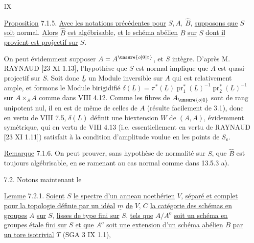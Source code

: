 \hfill IX

\uline{Proposition} 7.1.5. \uline{Avec les notations précédentes pour} $S,A,\ \hat B$, \uline{supposons que} $S$ \uline{soit} normal. \uline{Alors} $\hat B$ \uline{est algébrisable}, \uline{et le schéma abélien} $B$ \uline{sur} $S$ \uline{dont il provient est projectif sur} $S$.

On peut évidemment supposer $A=A^{\unsure{o|0|\circ}}$, et $S$ intègre. D'après M. RAYNAUD [23 XI 1.13], l'hypothèse que $S$ est normal implique que $A$ est quasi-projectif sur $S$. Soit donc $\underline L$ un Module inversible sur $A$ qui est relativement ample, et formons le Module birigidifié $\delta(\underline L)=\pi^*(\underline L)\operatorname{pr}_1^*(\underline L)^{-1}\operatorname{pr}_2^*(\underline L)^{-1}$ sur $A\times_S A$ comme dans VIII 4.12. Comme les fibres de $A_{\unsure{o|0}}$ sont de rang unipotent nul, il en est de même de celles de $A$ (résulte facilement de 3.1), donc en vertu de VIII 7.5, $\delta(\underline L)$ définit une biextension $W$ de $(A,A)$, évidemment symétrique, qui en vertu de VIII 4.13 (i.e. essentiellement en vertu de RAYNAUD [23 XI 1.11]) satisfait à la condition d'amplitude voulue en les points de $S_o$.

\uline{Remarque} 7.1.6. On peut prouver, sans hypothèse de normalité sur $S$, que $\hat B$ est toujours algébrisable, en se ramenant au cas normal comme dans 13.5.3 a).

7.2. Notons maintenant le

\uline{Lemme} 7.2.1. \uline{Soient} $S$ \uline{le spectre d'un anneau noethérien} $V$, \uline{séparé et complet pour la topologie définie par un idéal} $\underline m$ \uline{de} $V$, $C$ \uline{la catégorie des schémas en groupes} $A$ \uline{sur} $S$, \uline{lisses de type fini sur} $S$, \uline{tels que} $A/A^o$ \uline{soit un schéma en groupes étale fini sur} $S$ \uline{et que} $A^o$ \uline{soit une extension d'un schéma abélien} $B$ \uline{par un tore isotrivial} $T$ (SGA 3 IX 1.1),

